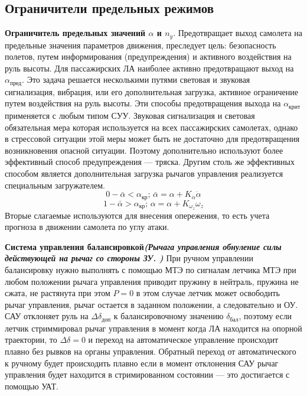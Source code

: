 \documentclass{article}
\begin{document}
\subsection{Ограничители предельных режимов}
\textbf{Ограничитель предельных значений $\alpha$ и $n_y$}.
Предотвращает выход самолета на предельные значения параметров движения,
преследует цель: безопасность полетов, путем информирования (предупреждения) и
активного воздействия на руль высоты.
Для пассажирских ЛА наиболее активно предотвращают выход на
$\alpha_\text{пред}$.
Это задача решается несколькими путями световая и звуковая сигнализация,
вибрация, или его дополнительная загрузка, активное ограничение путем
воздействия на руль высоты.
Эти способы предотвращения выхода на $\alpha_\text{крит}$ применяется с любым
типом СУУ. Звуковая сигнализация и световая обязательная мера которая
используется на всех пассажирских самолетах, однако в стрессовой ситуации этой
меры может быть не достаточно для предотвращения возникновения опасной ситуации.
Поэтому дополнительно используют более эффективный способ предупреждения ---
тряска. Другим столь же эффективных способом является дополнительная загрузка
рычагов управления реализуется специальным загружателем.
\[
	0 - \bar{\alpha} < \alpha_\text{кр}; \, \bar{\alpha} = \alpha +
	K_{\dot{\alpha}} \dot{\alpha}
\]
\[
	1 - \bar{\alpha} > \alpha_\text{кр}; \, \alpha = \alpha + K_{\omega_z}
	\omega_z
\]
Вторые слагаемые используются для внесения опережения, то есть учета прогноза в
движении самолета по углу атаки.

\textbf{Система управления балансировкой\emph{(Рычага управления обнуление силы
		действующей на рычаг со стороны ЗУ. )}}
При ручном управлении балансировку нужно выполнять с помощью МТЭ по сигналам
летчика МТЭ при любом положении рычага управления приводит пружину в нейтраль,
пружина не сжата, не растянута при этом $P=0$ в этом случае летчик может
освободить рычаг управления, рычаг остается в заданном положении, а
следовательно и ОУ.
САУ отклоняет руль на $\Delta\delta_\text{доп}$ к балансировочному значению
$\delta_\text{бал}$, поэтому если летчик стриммировал рычаг управления в момент
когда ЛА находится на опорной траектории, то $\Delta\delta = 0$ и переход на
автоматическое управление происходит плавно без рывков на органы управления.
Обратный переход от автоматического к ручному будет происходить плавно если в
момент отклонения САУ рычаг управления будет находится в стримированном
состоянии --- это достигается с помощью УАТ.
\newpage
\end{document}
